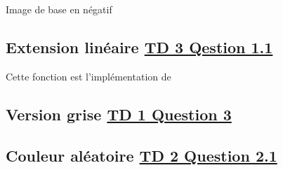 \documentclass{article}
\begin{document}
Image de base en négatif

\subsection{Extension linéaire \underline{TD 3 Qestion 1.1}}
Cette fonction est l'implémentation de 

\subsection{Version grise \underline{TD 1 Question 3}}

\subsection{Couleur aléatoire \underline{TD 2 Question 2.1}}
\end{document}
